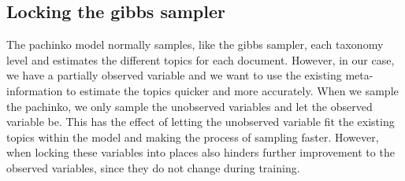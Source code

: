 \subsection{Locking the gibbs sampler}\label{sec:appendix/locking}
The pachinko model normally samples, like the gibbs sampler, each taxonomy level and estimates the different topics for each document.
However, in our case, we have a partially observed variable and we want to use the existing meta-information to estimate the topics quicker and more accurately.
When we sample the pachinko, we only sample the unobserved variables and let the observed variable be. 
This has the effect of letting the unobserved variable fit the existing topics within the model and making the process of sampling faster.
However, when locking these variables into places also hinders further improvement to the observed variables, since they do not change during training.   